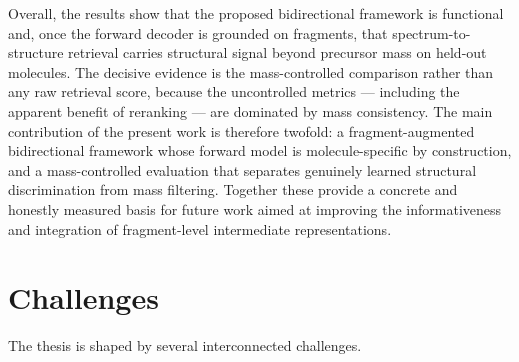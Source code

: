 Overall, the results show that the proposed bidirectional framework is functional and, once the forward decoder is grounded on fragments, that spectrum-to-structure retrieval carries structural signal beyond precursor mass on held-out molecules.
The decisive evidence is the mass-controlled comparison rather than any raw retrieval score, because the uncontrolled metrics --- including the apparent benefit of reranking --- are dominated by mass consistency.
The main contribution of the present work is therefore twofold: a fragment-augmented bidirectional framework whose forward model is molecule-specific by construction, and a mass-controlled evaluation that separates genuinely learned structural discrimination from mass filtering.
Together these provide a concrete and honestly measured basis for future work aimed at improving the informativeness and integration of fragment-level intermediate representations.



%
%


\section{Challenges}
The thesis is shaped by several interconnected challenges. 


